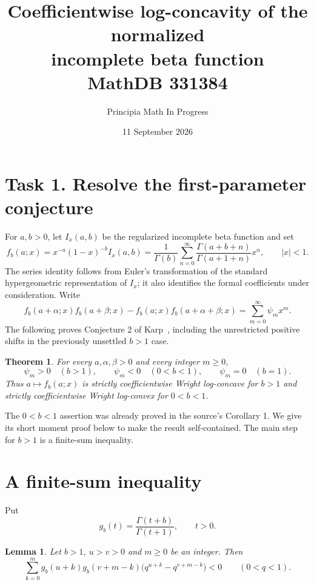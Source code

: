 \documentclass[11pt]{article}
\title{Coefficientwise log-concavity of the normalized\\
incomplete beta function\\\large MathDB 331384}
\author{Principia Math In Progress}
\date{11 September 2026}
\newtheorem{theorem}{Theorem}
\newtheorem{lemma}{Lemma}
\newcommand{\G}{\Gamma}
\begin{document}
\maketitle

\section*{Task 1. Resolve the first-parameter conjecture}

For $a,b>0$, let $I_x(a,b)$ be the regularized incomplete beta function and set
\[
 f_b(a;x)=x^{-a}(1-x)^{-b}I_x(a,b)
 =\frac1{\G(b)}\sum_{n=0}^\infty
       \frac{\G(a+b+n)}{\G(a+1+n)}x^n,\qquad |x|<1.
\]
The series identity follows from Euler's transformation of the standard
hypergeometric representation of $I_x$; it also identifies the formal
coefficients under consideration. Write
\[
 f_b(a+\alpha;x)f_b(a+\beta;x)
 -f_b(a;x)f_b(a+\alpha+\beta;x)
 =\sum_{m=0}^\infty \psi_m x^m .
\]
The following proves Conjecture 2 of Karp~\cite{K}, including the
unrestricted positive shifts in the previously unsettled $b>1$ case.

\begin{theorem}
For every $a,\alpha,\beta>0$ and every integer $m\geq0$,
\[
 \psi_m>0\quad(b>1),\qquad
 \psi_m<0\quad(0<b<1),\qquad
 \psi_m=0\quad(b=1).
\]
Thus $a\mapsto f_b(a;x)$ is strictly coefficientwise Wright
log-concave for $b>1$ and strictly coefficientwise Wright log-convex
for $0<b<1$.
\end{theorem}

The $0<b<1$ assertion was already proved in the source's Corollary 1.
We give its short moment proof below to make the result self-contained.
The main step for $b>1$ is a finite-sum inequality.

\section*{A finite-sum inequality}

Put
\[
 g_b(t)=\frac{\G(t+b)}{\G(t+1)},\qquad t>0.
\]

\begin{lemma}\label{lem:kernel}
Let $b>1$, $u>v>0$ and $m\geq0$ be an integer. Then
\begin{equation}
 \sum_{k=0}^m g_b(u+k)g_b(v+m-k)
       \bigl(q^{u+k}-q^{v+m-k}\bigr)<0
       \qquad(0<q<1).
 \label{eq:kernel}
\end{equation}
\end{lemma}
\end{document}
